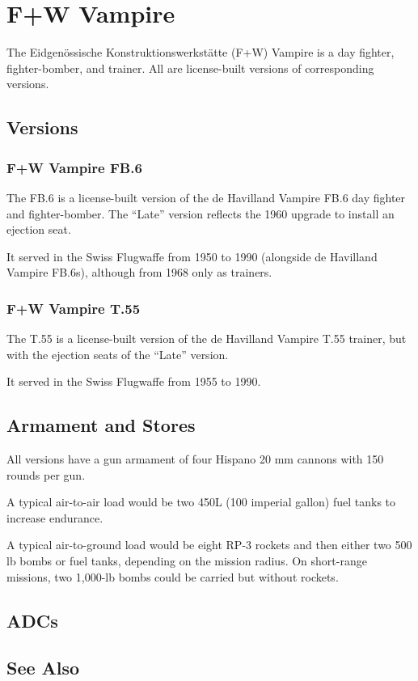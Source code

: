 \section{F+W Vampire}

The Eidgenössische Konstruktionswerkstätte (F+W) Vampire is a day fighter, fighter-bomber, and trainer. All are license-built versions of corresponding  versions.

\subsection{Versions}

\subsubsection{F+W Vampire FB.6}

The FB.6 is a license-built version of the de Havilland Vampire FB.6 day fighter and fighter-bomber. The “Late” version reflects the 1960 upgrade to install an ejection seat.

It served in the Swiss Flugwaffe from 1950 to 1990 (alongside de Havilland Vampire FB.6s), although from 1968 only as trainers.

\subsubsection{F+W Vampire T.55}

The T.55 is a license-built version of the de Havilland Vampire T.55 trainer, but with the ejection seats of the “Late” version.

It served in the Swiss Flugwaffe from 1955 to 1990.

\subsection{Armament and Stores}

All versions have a gun armament of four Hispano 20 mm cannons with 150 rounds per gun. 

A typical air-to-air load would be two 450L (100 imperial gallon) fuel tanks to increase endurance. 

A typical air-to-ground load would be eight RP-3 rockets and then either two 500 lb bombs or fuel tanks, depending on the mission radius. On short-range missions, two 1,000-lb bombs could be carried but without rockets.

\subsection{ADCs}

\begin{adclist}
\end{adclist}

\subsection{See Also}

\begin{typelist}
\end{typelist}